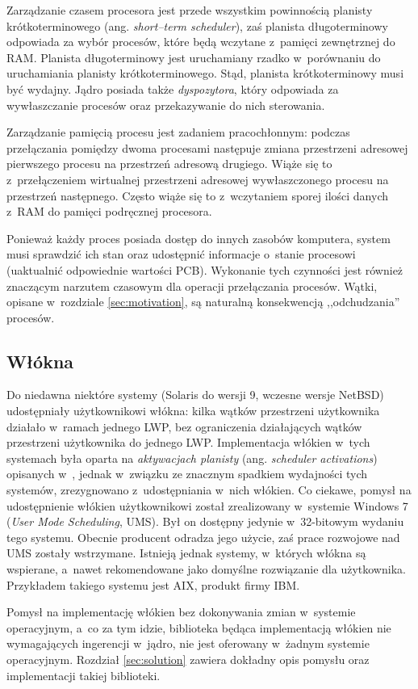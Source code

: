 \documentclass[12pt]{mwart}
\begin{document}
\par
%
\indent
  Zarządzanie czasem procesora jest przede wszystkim powinnością planisty krótkoterminowego (ang. \emph{short--term scheduler}),
  zaś planista długoterminowy odpowiada za wybór procesów, które będą wczytane z~pamięci zewnętrznej do RAM. Planista długoterminowy
  jest uruchamiany rzadko w~porównaniu do uruchamiania planisty krótkoterminowego. Stąd, planista krótkoterminowy musi być wydajny.
  Jądro posiada także \emph{dyspozytora}, który odpowiada za wywłaszczanie procesów oraz przekazywanie do nich sterowania.
\par
%
\indent
  Zarządzanie pamięcią procesu jest zadaniem pracochłonnym: podczas przełączania pomiędzy dwoma procesami następuje zmiana 
  przestrzeni adresowej pierwszego procesu na przestrzeń adresową drugiego. Wiąże się to z~przełączeniem wirtualnej przestrzeni adresowej 
  wywłaszczonego procesu na przestrzeń następnego. Często wiąże się to z~wczytaniem sporej ilości danych z~RAM do pamięci podręcznej procesora.
\par
%
\indent
  Ponieważ każdy proces posiada dostęp do innych zasobów komputera, system musi sprawdzić ich stan oraz udostępnić informacje o~stanie procesowi
  (uaktualnić odpowiednie wartości PCB). Wykonanie tych czynności jest również znaczącym narzutem czasowym dla operacji przełączania procesów.
  Wątki, opisane w~rozdziale \ref{sec:motivation}, są naturalną konsekwencją ,,odchudzania'' procesów.
\par
%
\subsection{Włókna}
\label{sec:fibers}
%
\indent
  Do niedawna niektóre systemy (Solaris do wersji 9, wczesne wersje NetBSD) udostępniały użytkownikowi włókna: kilka wątków przestrzeni użytkownika
  działało w~ramach jednego LWP, bez ograniczenia działających wątków przestrzeni użytkownika do jednego LWP.
  Implementacja włókien w~tych systemach była oparta na \emph{aktywacjach planisty} (ang. \emph{scheduler activations}) opisanych
  w~\cite{hennessy}, jednak
  w~związku ze znacznym spadkiem wydajności tych systemów, zrezygnowano z~udostępniania w~nich włókien.
  Co ciekawe, pomysł na udostępnienie włókien użytkownikowi został zrealizowany w~systemie Windows 7 (\emph{User Mode Scheduling}, UMS). Był on dostępny
  jedynie w~32-bitowym wydaniu tego systemu. Obecnie producent odradza jego użycie, zaś prace rozwojowe nad UMS zostały wstrzymane.
  Istnieją jednak systemy, w~których włókna są wspierane, a~nawet rekomendowane jako domyślne rozwiązanie dla użytkownika. Przykładem takiego systemu jest
  AIX, produkt firmy IBM.
\par
%
\indent
  Pomysł na implementację włókien bez dokonywania zmian w~systemie operacyjnym, a~co za tym idzie,
  biblioteka będąca implementacją włókien nie wymagających ingerencji w~jądro, nie jest oferowany w~żadnym systemie operacyjnym.
  Rozdział \ref{sec:solution} zawiera dokładny opis pomysłu oraz implementacji takiej biblioteki.
\par
%
\end{document}
